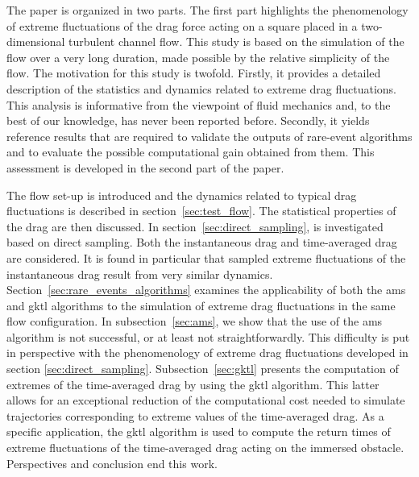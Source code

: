 %
The paper is organized in two parts. The first part highlights the phenomenology of extreme fluctuations of the drag force acting on a square placed in a two-dimensional turbulent channel flow. This study is based on the simulation of the flow over a very long duration, made possible by the relative simplicity of the flow.
%
The motivation for this study is twofold.
Firstly, it provides a detailed description of the statistics and dynamics related to extreme drag fluctuations. This analysis is informative from the  viewpoint of fluid mechanics and, to the best of our knowledge, has never been reported before.
Secondly, it yields reference results that are required to validate the outputs of rare-event algorithms and to evaluate the possible computational gain obtained from them. This assessment is developed in the second part of the paper.

The flow set-up is introduced and the dynamics related to typical
drag fluctuations is described in section~\ref{sec:test_flow}.
The statistical properties of the drag are then discussed.
In section~\ref{sec:direct_sampling},  is investigated based on direct sampling.
Both the instantaneous drag and time-averaged drag are considered.
It is found in particular that sampled extreme fluctuations of the instantaneous drag result from very similar dynamics. 
Section~\ref{sec:rare_events_algorithms} examines the applicability of both the \ac{ams} and \ac{gktl} algorithms to the simulation of extreme drag fluctuations in the same flow configuration.
In subsection~\ref{sec:ams}, we show that the use of the \ac{ams} algorithm is not successful, or at least not straightforwardly. This difficulty is put in perspective with the phenomenology of extreme drag fluctuations developed in  section \ref{sec:direct_sampling}.
Subsection~\ref{sec:gktl} presents the computation of extremes of the time-averaged drag by using the \ac{gktl} algorithm.
This latter allows for an exceptional reduction of the computational cost needed to simulate trajectories corresponding to extreme values of the time-averaged drag.
As a specific  application, the \ac{gktl} algorithm is used to compute the return times of extreme fluctuations of the time-averaged drag acting on the immersed obstacle.
Perspectives and conclusion end this work.